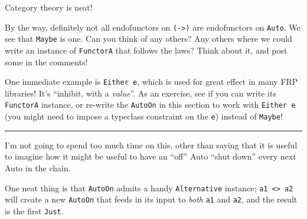 \documentclass[]{article}
\newenvironment{Shaded}{}{}
\newcommand{\CommentTok}[1]{\textcolor[rgb]{0.38,0.63,0.69}{\textit{#1}}}
\newcommand{\DataTypeTok}[1]{\textcolor[rgb]{0.56,0.13,0.00}{#1}}
\newcommand{\KeywordTok}[1]{\textcolor[rgb]{0.00,0.44,0.13}{\textbf{#1}}}
\newcommand{\NormalTok}[1]{#1}
\newcommand{\OperatorTok}[1]{\textcolor[rgb]{0.40,0.40,0.40}{#1}}
\newcommand{\OtherTok}[1]{\textcolor[rgb]{0.00,0.44,0.13}{#1}}
\begin{document}
Category theory is neat!

By the way, definitely not all endofunctors on \texttt{(-\textgreater{})} are
endofunctors on \texttt{Auto}. We see that \texttt{Maybe} is one. Can you think
of any others? Any others where we could write an instance of \texttt{FunctorA}
that follows the laws? Think about it, and post some in the comments!

One immediate example is \texttt{Either\ e}, which is used for great effect in
many FRP libraries! It's ``inhibit, with a \emph{value}''. As an exercise, see
if you can write its \texttt{FunctorA} instance, or re-write the \texttt{AutoOn}
in this section to work with \texttt{Either\ e} (you might need to impose a
typeclass constraint on the \texttt{e}) instead of \texttt{Maybe}!

\begin{center}\rule{0.5\linewidth}{0.5pt}\end{center}

I'm not going to spend too much time on this, other than saying that it is
useful to imagine how it might be useful to have an ``off'' Auto ``shut down''
every next Auto in the chain.

One neat thing is that \texttt{AutoOn} admits a handy \texttt{Alternative}
instance; \texttt{a1\ \textless{}\textbar{}\textgreater{}\ a2} will create a new
\texttt{AutoOn} that feeds in its input to \emph{both} \texttt{a1} and
\texttt{a2}, and the result is the first \texttt{Just}.

\begin{Shaded}
\end{Shaded}
\end{document}
